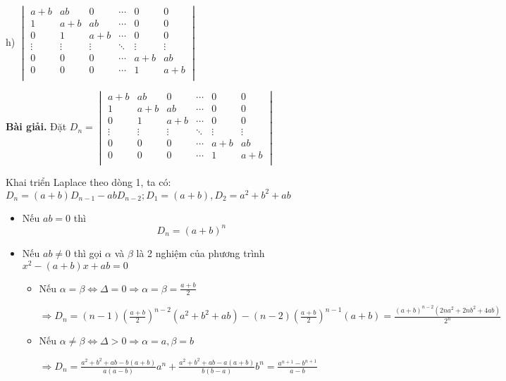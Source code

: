 \documentclass[12pt]{report}
\begin{document}
h) $\begin{vmatrix}
	a+b & ab & 0 & \cdots & 0 & 0 \\
	1 & a+b & ab & \cdots & 0 & 0 \\
	0 & 1 & a+b & \cdots & 0 & 0 \\
	\vdots & \vdots & \vdots & \ddots & \vdots & \vdots \\
	0 & 0 & 0 & \cdots & a+b & ab \\
	0 & 0 & 0 & \cdots & 1 & a+b \\
\end{vmatrix}$

\textbf{Bài giải.} Đặt $D_n = \begin{vmatrix}
	a+b & ab & 0 & \cdots & 0 & 0 \\
	1 & a+b & ab & \cdots & 0 & 0 \\
	0 & 1 & a+b & \cdots & 0 & 0 \\
	\vdots & \vdots & \vdots & \ddots & \vdots & \vdots \\
	0 & 0 & 0 & \cdots & a+b & ab \\
	0 & 0 & 0 & \cdots & 1 & a+b \\
\end{vmatrix}$

Khai triển Laplace theo dòng 1, ta có: $D_n = (a+b)D_{n-1} - ab D_{n-2}; D_1 = (a+b), D_2 = a^2+b^2+ab$

\begin{itemize}
	\item Nếu $ab = 0$ thì \[ D_n = (a+b)^n \]
	\item Nếu $ab \neq 0$ thì gọi $\alpha$ và $\beta$ là 2 nghiệm của phương trình $x^2 - (a+b)x + ab = 0$
	\begin{itemize}
		\item Nếu $\alpha = \beta \Leftrightarrow \Delta = 0 \Rightarrow \alpha = \beta = \frac{a+b}{2}$ 
		
		$\Rightarrow D_n = (n-1) \left( \frac{a+b}{2} \right)^{n-2} (a^2+b^2+ab) - (n-2) \left(\frac{a+b}{2}\right)^{n-1} (a+b) = \frac{(a+b)^{n-2}(2na^2+2nb^2+4ab)}{2^n}$
		
		\item Nếu $\alpha \neq \beta \Leftrightarrow \Delta > 0 \Rightarrow \alpha = a, \beta = b$
		
		$\Rightarrow D_n = \frac{a^2+b^2+ab - b(a+b)}{a(a-b)} a^n + \frac{a^2+b^2+ab - a(a+b)}{b(b-a)} b^n = \frac{a^{n+1} - b^{n+1}}{a-b}$
	\end{itemize}
\end{itemize}
\end{document}
